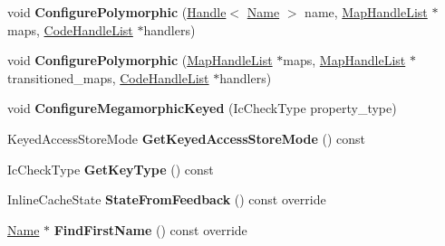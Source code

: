 \begin{DoxyCompactItemize}
\item 
void {\bfseries Configure\+Polymorphic} (\hyperlink{classv8_1_1internal_1_1_handle}{Handle}$<$ \hyperlink{classv8_1_1internal_1_1_name}{Name} $>$ name, \hyperlink{classv8_1_1internal_1_1_list}{Map\+Handle\+List} $\ast$maps, \hyperlink{classv8_1_1internal_1_1_list}{Code\+Handle\+List} $\ast$handlers)\hypertarget{classv8_1_1internal_1_1_keyed_store_i_c_nexus_a5ed5c8a305225e2596d571e68857ecdb}{}\label{classv8_1_1internal_1_1_keyed_store_i_c_nexus_a5ed5c8a305225e2596d571e68857ecdb}

\item 
void {\bfseries Configure\+Polymorphic} (\hyperlink{classv8_1_1internal_1_1_list}{Map\+Handle\+List} $\ast$maps, \hyperlink{classv8_1_1internal_1_1_list}{Map\+Handle\+List} $\ast$transitioned\+\_\+maps, \hyperlink{classv8_1_1internal_1_1_list}{Code\+Handle\+List} $\ast$handlers)\hypertarget{classv8_1_1internal_1_1_keyed_store_i_c_nexus_a5d70bd30a37c831474743683d2e7d67f}{}\label{classv8_1_1internal_1_1_keyed_store_i_c_nexus_a5d70bd30a37c831474743683d2e7d67f}

\item 
void {\bfseries Configure\+Megamorphic\+Keyed} (Ic\+Check\+Type property\+\_\+type)\hypertarget{classv8_1_1internal_1_1_keyed_store_i_c_nexus_a2d332e9b30f3d32c1f672797444fa8f7}{}\label{classv8_1_1internal_1_1_keyed_store_i_c_nexus_a2d332e9b30f3d32c1f672797444fa8f7}

\item 
Keyed\+Access\+Store\+Mode {\bfseries Get\+Keyed\+Access\+Store\+Mode} () const \hypertarget{classv8_1_1internal_1_1_keyed_store_i_c_nexus_a976727076ad40858bca1e87ed7a1e813}{}\label{classv8_1_1internal_1_1_keyed_store_i_c_nexus_a976727076ad40858bca1e87ed7a1e813}

\item 
Ic\+Check\+Type {\bfseries Get\+Key\+Type} () const \hypertarget{classv8_1_1internal_1_1_keyed_store_i_c_nexus_a89ba225b795463c87e1d50fd4d034eb7}{}\label{classv8_1_1internal_1_1_keyed_store_i_c_nexus_a89ba225b795463c87e1d50fd4d034eb7}

\item 
Inline\+Cache\+State {\bfseries State\+From\+Feedback} () const  override\hypertarget{classv8_1_1internal_1_1_keyed_store_i_c_nexus_aa9403788ef3b21e7963d79ae1a01ab63}{}\label{classv8_1_1internal_1_1_keyed_store_i_c_nexus_aa9403788ef3b21e7963d79ae1a01ab63}

\item 
\hyperlink{classv8_1_1internal_1_1_name}{Name} $\ast$ {\bfseries Find\+First\+Name} () const  override\hypertarget{classv8_1_1internal_1_1_keyed_store_i_c_nexus_a454e821038e1f704475121aa35256245}{}\label{classv8_1_1internal_1_1_keyed_store_i_c_nexus_a454e821038e1f704475121aa35256245}

\end{DoxyCompactItemize}
